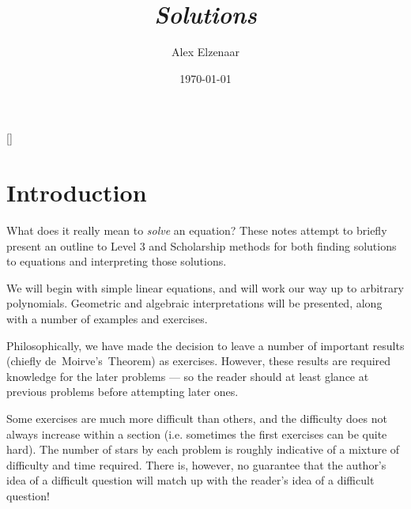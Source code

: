 \documentclass[a4paper,10pt,titlepage]{article}
\title{\textbf{\textit{Solutions}}}
\author{Alex Elzenaar}%
\date{\today}
\theoremstyle{definition}
\begin{document}
\setcounter{tocdepth}{1}
\maketitle
\newpage\null\thispagestyle{empty}\newpage
{}

\tableofcontents

[{\titlerule[0.8pt]}]
\let\oldsection\section
\renewcommand\section{\clearpage\oldsection}

\section{Introduction}\label{sec:intro}
What does it really mean to \emph{solve} an equation? These notes attempt
to briefly present an outline to Level 3 and Scholarship methods for both finding
solutions to equations and interpreting those solutions.

We will begin with simple linear equations, and will work our way up to arbitrary
polynomials. Geometric and algebraic interpretations will be presented, along with
a number of examples and exercises.

Philosophically, we have made the decision to leave a number of important results
(chiefly de~Moirve's~Theorem) as exercises. However, these results are required
knowledge for the later problems --- so the reader should at least glance at previous
problems before attempting later ones.

Some exercises are much more difficult than others, and the difficulty does not
always increase within a section (i.e. sometimes the first exercises can be quite
hard). The number of stars by each problem is roughly indicative of a mixture of
difficulty and time required. There is, however, no guarantee that the author's
idea of a difficult question will match up with the reader's idea of a difficult
question!
\end{document}

